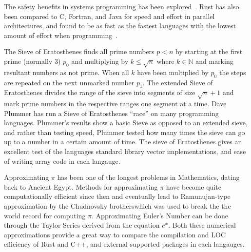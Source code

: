 \documentclass[10pt]{IEEEtran}
\begin{document}
The safety benefits in systems programming has been explored~\cite{BalasubramanianProceedings}. 
Rust has also been compared to C, Fortran, and Java for speed and effort in parallel architectures, 
and found to be as fast as the fastest languages with the lowest amount of effort when programming~\cite{costanzo2021performance}\cite{heyman2020comparison}.
\par
The Sieve of Eratosthenes finds all prime numbers $p<n$ by starting at the first prime (normally 3) $p_0$ and multiplying by $k \leq \sqrt{n}$ where $k \in \mathbb{N}$ and marking resultant numbers as not prime.
When all $k$ have been multiplied by $p_0$ the steps are repeated on the next unmarked number $p_1$.
The extended Sieve of Eratosthenes divides the range of the sieve into segments of size $\sqrt{n}+1$ and mark prime numbers in the respective ranges one segment at a time.
Dave Plummer has run a Sieve of Eratosthenes “race” on many programming languages\cite{plummer}. 
Plummer's results show a basic Sieve as opposed to an extended sieve, and rather than testing speed, Plummer tested how many times 
the sieve can go up to a number in a certain amount of time. 
The sieve of Eratosthenes gives an excellent test of the languages standard library vector implementations, and ease of writing array code in each langauge.
\par
Approximating $\pi$ has been one of the longest problems in Mathematics, dating back to Ancient Egypt\cite{burton}. Methods for approximating $\pi$ have become quite computationally efficient since then and eventually 
lead to Ramunujan-type approximation by the Chudnovsky brotherswhich was used to break the the world record for computing $\pi$\cite{lynn}.
Approximating Euler's Number can be done through the Taylor Series derived from the equation $e^x$. Both these numerical approximations provide a great way to compare the compilation and LOC efficiency of Rust and C++, and external supported packages in each langauges.
\nocite{*}


\end{document}
